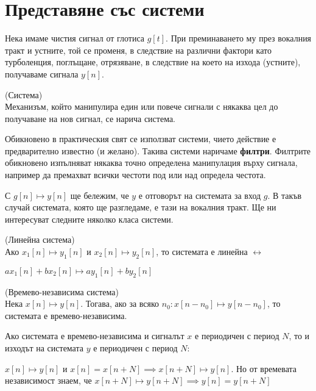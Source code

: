 \documentclass[main.tex]{subfiles}
\begin{document}
\section{Представяне със системи}
Нека имаме чистия сигнал от глотиса $g[t]$. При преминаването му през вокалния тракт и устните, той
се променя, в следствие на различни фактори като турболенция, поглъщане, отрязяване, в следствие на което 
на изхода (устните), получаваме сигнала $y[n]$.

\begin{definition*}{(Система)}\\
Механизъм, който манипулира един или повече сигнали с някаква цел до
получаване на нов сигнал, се нарича система.

Обикновено в практическия свят се използват системи, чието действие е предварително известно (и желано). Такива системи
наричаме \textbf{филтри}. Филтрите обикновено изпълняват някаква точно определена манипулация върху сигнала, например
да премахват всички честоти под или над определа честота.
\end{definition*}

С $g[n] \mapsto y[n]$ ще бележим, че $y$ е отговорът на системата за вход $g$. В такъв случай системата, която ще разгледаме, е тази на вокалния тракт. Ще ни интересуват
следните няколко класа системи.

\begin{definition*}{(Линейна система)}\\
    Ако $x_1[n] \mapsto y_1[n]$ и $x_2[n] \mapsto y_2[n]$, то системата е линейна $\longleftrightarrow$

    $ax_1[n] + bx_2[n] \mapsto ay_1[n] + by_2[n]$ 
\end{definition*}


\begin{definition*}{(Времево-независима система)}\\
    Нека $x[n] \mapsto y[n]$. Тогава, ако за всяко $n_0: x[n - n_0] \mapsto y[n - n_0]$, то
    системата е времево-независима.
\end{definition*}

\begin{property}
\label{systems:periodicity}
Ако системата е времево-независима и сигналът $x$ е периодичен с период $N$,
то и изходът на системата $y$ е периодичен с период $N$:

$x[n] \mapsto y[n]$ и $x[n] = x[n+N] \implies x[n+N] \mapsto y[n]$. Но от времевата независимост знаем, че
$x[n+N] \mapsto y[n+N] \implies y[n] = y[n+N]$
\end{property}
\end{document}
